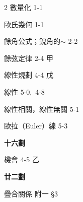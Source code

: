 \begin{multicols}{2}
\noindent 數量化 \hfill 1-1\par
\noindent 歐氏幾何 \hfill 1-1\par
\noindent 餘角公式；銳角的$\sim$ \hfill 2-2\par
\noindent 餘弦定律 \hfill 2-4 甲\par
\noindent 線性規劃 \hfill 4-4 戊\par
\noindent 線性 \hfill 5-0,\, 4-8\par
\noindent 線性相關，線性無關 \hfill 5-1\par
\noindent 歐拉（Euler）線 \hfill 5-3\par

\vspace{0.8em}
\begin{center}
\textbf{\large 十六劃}
\end{center}

\noindent 機會 \hfill 4-5 乙\par

\vspace{0.8em}
\begin{center}
\textbf{\large 廿二劃}
\end{center}

\noindent 疊合關係 \hfill 附一 \S 3\par

\end{multicols}
